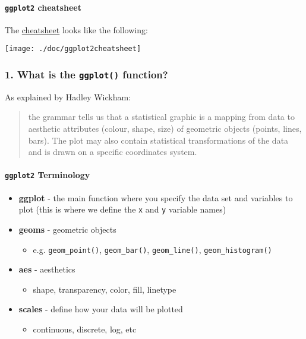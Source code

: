 \documentclass[]{article}
\providecommand{\tightlist}{%
  \setlength{\itemsep}{0pt}\setlength{\parskip}{0pt}}
\let\oldparagraph\paragraph
\renewcommand{\paragraph}[1]{\oldparagraph{#1}\mbox{}}
\begin{document}
\hypertarget{ggplot2-cheatsheet}{%
\paragraph{\texorpdfstring{\texttt{ggplot2}
cheatsheet}{ggplot2 cheatsheet}}\label{ggplot2-cheatsheet}}

The
\href{https://www.rstudio.com/wp-content/uploads/2015/03/ggplot2-cheatsheet.pdf}{cheatsheet}
looks like the following:

\texttt{[image: ./doc/ggplot2cheatsheet]}

\hypertarget{what-is-the-ggplot-function}{%
\subsubsection{\texorpdfstring{1. What is the \texttt{ggplot()}
function?}{1. What is the ggplot() function?}}\label{what-is-the-ggplot-function}}

As explained by Hadley Wickham:

\begin{quote}
the grammar tells us that a statistical graphic is a mapping from data
to aesthetic attributes (colour, shape, size) of geometric objects
(points, lines, bars). The plot may also contain statistical
transformations of the data and is drawn on a specific coordinates
system.
\end{quote}

\hypertarget{ggplot2-terminology}{%
\paragraph{\texorpdfstring{\texttt{ggplot2}
Terminology}{ggplot2 Terminology}}\label{ggplot2-terminology}}

\begin{itemize}
\tightlist
\item
  \textbf{ggplot} - the main function where you specify the data set and
  variables to plot (this is where we define the \texttt{x} and
  \texttt{y} variable names)
\item
  \textbf{geoms} - geometric objects

  \begin{itemize}
  \tightlist
  \item
    e.g. \texttt{geom\_point()}, \texttt{geom\_bar()},
    \texttt{geom\_line()}, \texttt{geom\_histogram()}
  \end{itemize}
\item
  \textbf{aes} - aesthetics

  \begin{itemize}
  \tightlist
  \item
    shape, transparency, color, fill, linetype
  \end{itemize}
\item
  \textbf{scales} - define how your data will be plotted

  \begin{itemize}
  \tightlist
  \item
    continuous, discrete, log, etc
  \end{itemize}
\end{itemize}
\end{document}
